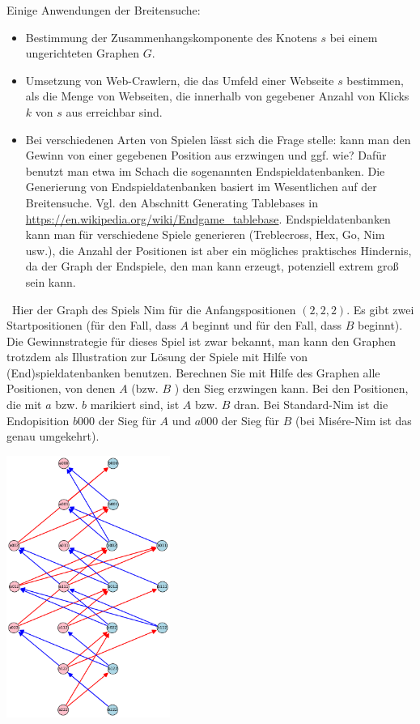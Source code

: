 \begin{bem} Einige Anwendungen der Breitensuche: 
	\begin{itemize} 
		\item Bestimmung der Zusammenhangskomponente des Knotens $s$ bei einem ungerichteten Graphen $G$. 
		\item Umsetzung von Web-Crawlern, die das Umfeld einer Webseite $s$ bestimmen, als die Menge von Webseiten, die innerhalb von gegebener Anzahl von Klicks $k$ von $s$ aus erreichbar sind. 
		\item Bei verschiedenen Arten von Spielen lässt sich die Frage stelle: kann man den Gewinn von einer gegebenen Position aus erzwingen und ggf. wie? Dafür benutzt man etwa im Schach die sogenannten Endspieldatenbanken. 
		Die Generierung von Endspieldatenbanken basiert im Wesentlichen auf der Breitensuche. Vgl. den Abschnitt Generating Tablebases in  \url{https://en.wikipedia.org/wiki/Endgame_tablebase}. Endspieldatenbanken kann man für verschiedene Spiele generieren (Treblecross, Hex, Go, Nim usw.), die Anzahl der Positionen ist aber ein mögliches praktisches Hindernis, da der Graph der Endspiele, den man kann erzeugt, potenziell extrem groß sein kann.   
	\end{itemize} 
\end{bem} 

\begin{aufg}\ Hier der Graph des Spiels Nim für die Anfangspositionen $(2,2,2)$. Es gibt zwei Startpositionen (für den Fall, dass $A$ beginnt und für den Fall, dass $B$ beginnt). Die Gewinnstrategie für dieses Spiel ist zwar bekannt, man kann den Graphen trotzdem als Illustration zur Lösung der Spiele mit Hilfe von (End)spieldatenbanken benutzen. Berechnen Sie mit Hilfe des Graphen alle Positionen, von denen $A$ (bzw. $B$ ) den Sieg erzwingen kann. Bei den Positionen, die mit $a$ bzw. $b$ marikiert sind, ist $A$ bzw. $B$ dran. Bei Standard-Nim ist die Endopisition $b000$ der Sieg für $A$ und $a000$ der Sieg für $B$ (bei Mis\'ere-Nim ist das genau umgekehrt). 
\begin{center}
			\includegraphics[width=0.4\textwidth]{Code/nim_222.pdf}
	\end{center} 
\end{aufg}

